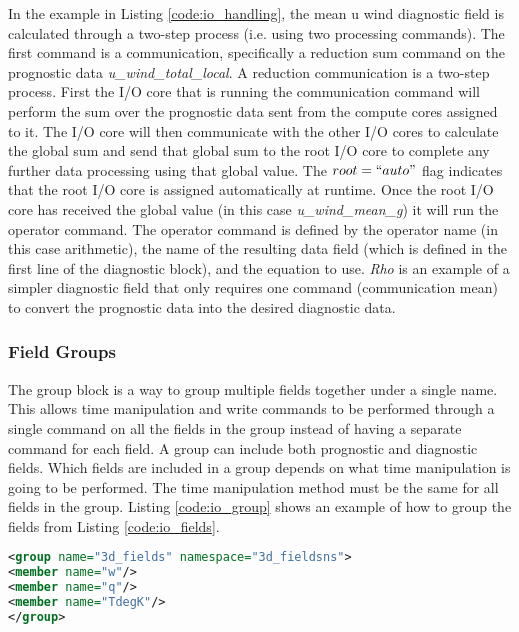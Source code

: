 In the example in Listing \ref{code:io_handling}, the mean u wind diagnostic field is calculated through a two-step process (i.e. using two processing commands). The first command is a communication, specifically a reduction sum command on the prognostic data \textit{u\_wind\_total\_local}. A reduction communication is a two-step process. First the I/O core that is running the communication command will perform the sum over the prognostic data sent from the compute cores assigned to it. The I/O core will then communicate with the other I/O cores to calculate the global sum and send that global sum to the root I/O core to complete any further data processing using that global value. The $root=``auto"$ flag indicates that the root I/O core is assigned automatically at runtime. Once the root I/O core has received the global value (in this case \textit{u\_wind\_mean\_g}) it will run the operator command. The operator command is defined by the operator name (in this case arithmetic), the name of the resulting data field (which is defined in the first line of the diagnostic block), and the equation to use. \textit{Rho} is an example of a simpler diagnostic field that only requires one command (communication mean) to convert the prognostic data into the desired diagnostic data. \citep{brown2018,moncCode}

\subsubsection{Field Groups}
The group block is a way to group multiple fields together under a single name. This allows time manipulation and write commands to be performed through a single command on all the fields in the group instead of having a separate command for each field. A group can include both prognostic and diagnostic fields. Which fields are included in a group depends on what time manipulation is going to be performed. The time manipulation method must be the same for all fields in the group. Listing \ref{code:io_group} shows an example of how to group the fields from Listing \ref{code:io_fields}. \citep{brown2018,moncCode}

\begin{lstlisting}[language=XML,caption=Example of a MONC I/O field group containing three variables: w\, q\, and TdegK.,label={code:io_group},belowskip=-1cm]
<group name="3d_fields" namespace="3d_fieldsns">
<member name="w"/>
<member name="q"/>
<member name="TdegK"/>
</group>
\end{lstlisting}

